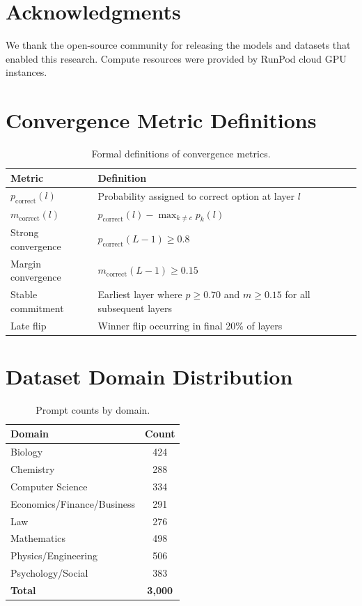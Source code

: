 \documentclass[11pt]{article}
\theoremstyle{definition}
\begin{document}
\section*{Acknowledgments}

We thank the open-source community for releasing the models and datasets that enabled this research. Compute resources were provided by RunPod cloud GPU instances.



\appendix

\section{Convergence Metric Definitions}

\begin{table}[ht]
\centering
\caption{Formal definitions of convergence metrics.}
\label{tab:definitions}
\begin{tabular}{lp{8cm}}
\toprule
\textbf{Metric} & \textbf{Definition} \\
\midrule
$p_{\text{correct}}(l)$ & Probability assigned to correct option at layer $l$ \\
$m_{\text{correct}}(l)$ & $p_{\text{correct}}(l) - \max_{k \neq c} p_k(l)$ \\
Strong convergence & $p_{\text{correct}}(L-1) \geq 0.8$ \\
Margin convergence & $m_{\text{correct}}(L-1) \geq 0.15$ \\
Stable commitment & Earliest layer where $p \geq 0.70$ and $m \geq 0.15$ for all subsequent layers \\
Late flip & Winner flip occurring in final 20\% of layers \\
\bottomrule
\end{tabular}
\end{table}

\section{Dataset Domain Distribution}

\begin{table}[ht]
\centering
\caption{Prompt counts by domain.}
\label{tab:domains}
\begin{tabular}{lc}
\toprule
\textbf{Domain} & \textbf{Count} \\
\midrule
Biology & 424 \\
Chemistry & 288 \\
Computer Science & 334 \\
Economics/Finance/Business & 291 \\
Law & 276 \\
Mathematics & 498 \\
Physics/Engineering & 506 \\
Psychology/Social & 383 \\
\midrule
\textbf{Total} & \textbf{3,000} \\
\bottomrule
\end{tabular}
\end{table}
\end{document}
